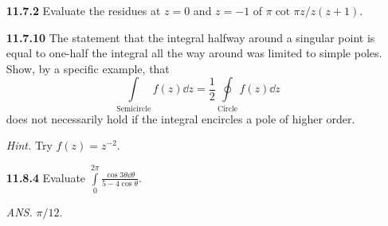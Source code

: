 \documentclass{article}
\begin{document}
\begin{enumerate}[align=parleft,labelsep=26pt]
    \item [\textbf{11.7.2}] Evaluate the residues at $z=0$ and $z=-1$ of $\pi\cot\pi z/z(z+1)$.

    \item [\textbf{11.7.10}] The statement that the integral halfway around a singular point is equal to one-half the integral all the way around was limited to simple poles. Show, by a specific example, that
    \[
        \int\limits_\text{Semicircle} f(z)\dd{z} = \frac{1}{2}\oint\limits_\text{Circle} f(z)\dd{z}
    \]
    does not necessarily hold if the integral encircles a pole of higher order.

    \textit{Hint.} Try $f(z) = z^{-2}$.

    \item [\textbf{11.8.4}] Evaluate $\displaystyle\int\limits_0^{2\pi} \frac{\cos 3\theta\dd{\theta}}{5-4\cos\theta}$.

    \hfill\textit{ANS. } $\pi/12$.
\end{enumerate}
\end{document}
